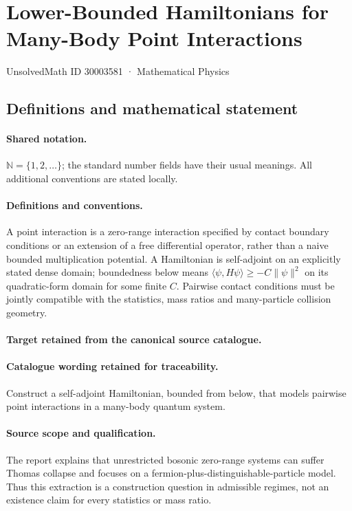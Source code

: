 \documentclass[11pt]{article}
\begin{document}
\setcounter{section}{30003580}
\section{Lower-Bounded Hamiltonians for Many-Body Point Interactions}\label{30003581}
{\small UnsolvedMath ID 30003581 · Mathematical Physics}
\subsection{Definitions and mathematical statement}

\paragraph{Shared notation.}$\mathbb N=\{1,2,\ldots\}$; the standard number fields have their usual meanings. All additional conventions are stated locally.


\paragraph{Definitions and conventions.}
A point interaction is a zero-range interaction specified by contact boundary conditions or an extension of a free differential operator, rather than a naive bounded multiplication potential. A Hamiltonian is self-adjoint on an explicitly stated dense domain; boundedness below means $\langle\psi,H\psi\rangle\geq-C\|\psi\|^2$ on its quadratic-form domain for some finite $C$. Pairwise contact conditions must be jointly compatible with the statistics, mass ratios and many-particle collision geometry.

\paragraph{Target retained from the canonical source catalogue.}
\paragraph{Catalogue wording retained for traceability.}
Construct a self-adjoint Hamiltonian, bounded from below, that models pairwise point interactions in a many-body quantum system.

\paragraph{Source scope and qualification.}
The report explains that unrestricted bosonic zero-range systems can suffer Thomas collapse and focuses on a fermion-plus-distinguishable-particle model. Thus this extraction is a construction question in admissible regimes, not an existence claim for every statistics or mass ratio.
\end{document}
